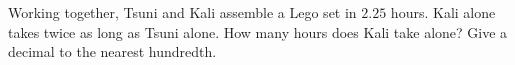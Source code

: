 Working together, Tsuni and Kali assemble a Lego set in $2.25$ hours. Kali alone takes twice as long as Tsuni alone. How many hours does Kali take alone? Give a decimal to the nearest hundredth.
